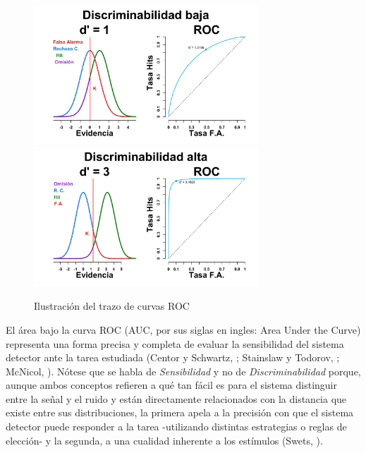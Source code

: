 \begin{figure}[th]
\centering
\includegraphics[width=0.75\textwidth]{Figures/ROC_2} \\
\includegraphics[width=0.75\textwidth]{Figures/ROC_3}\\
\caption[Ejemplo de Curva ROC]{Ilustración del trazo de curvas ROC}
\label{fig:Graf_ROC}
\end{figure}


El área bajo la curva ROC (AUC, por sus siglas en ingles: Area Under the Curve) representa una forma precisa y completa de evaluar la sensibilidad del sistema detector ante la tarea estudiada (Centor y Schwartz, \citeyear{Centor1985}; Stainslaw y Todorov, \citeyear{Stainslaw1999}; McNicol, \citeyear{McNicol5}). Nótese que se habla de \textit{Sensibilidad} y no de \textit{Discriminabilidad} porque, aunque ambos conceptos refieren a qué tan fácil es para el sistema distinguir entre la señal y el ruido y están directamente relacionados con la distancia que existe entre sus distribuciones, la primera apela a la precisión con que el sistema detector puede responder a la tarea -utilizando distintas estrategias o reglas de elección- y la segunda, a una cualidad inherente a los estímulos (Swets, \citeyear{Swets1973}).\\

